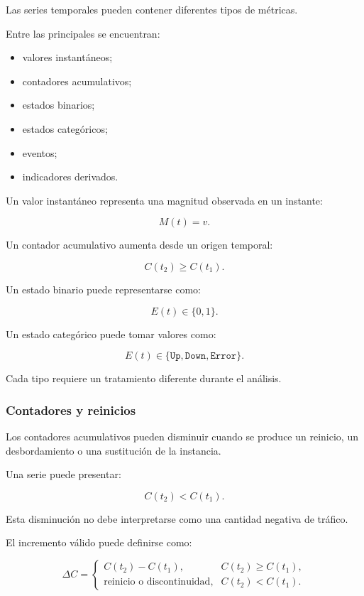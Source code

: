 Las series temporales pueden contener diferentes tipos de métricas.

Entre las principales se encuentran:

\begin{itemize}
    \item valores instantáneos;

    \item contadores acumulativos;

    \item estados binarios;

    \item estados categóricos;

    \item eventos;

    \item indicadores derivados.
\end{itemize}

Un valor instantáneo representa una magnitud observada en un instante:

\[
    M(t)
    =
    v.
\]

Un contador acumulativo aumenta desde un origen temporal:

\[
    C(t_2)
    \geq
    C(t_1).
\]

Un estado binario puede representarse como:

\[
    E(t)
    \in
    \{
        0,1
    \}.
\]

Un estado categórico puede tomar valores como:

\[
    E(t)
    \in
    \{
        \texttt{Up},
        \texttt{Down},
        \texttt{Error}
    \}.
\]

Cada tipo requiere un tratamiento diferente durante el análisis.


\subsubsection*{Contadores y reinicios}

Los contadores acumulativos pueden disminuir cuando se produce un
reinicio, un desbordamiento o una sustitución de la instancia.

Una serie puede presentar:

\[
    C(t_2)
    <
    C(t_1).
\]

Esta disminución no debe interpretarse como una cantidad negativa de
tráfico.

El incremento válido puede definirse como:

\[
    \Delta C
    =
    \begin{cases}
        C(t_2)-C(t_1), &
        C(t_2)\geq C(t_1),\\
        \text{reinicio o discontinuidad}, &
        C(t_2)<C(t_1).
    \end{cases}
\]

